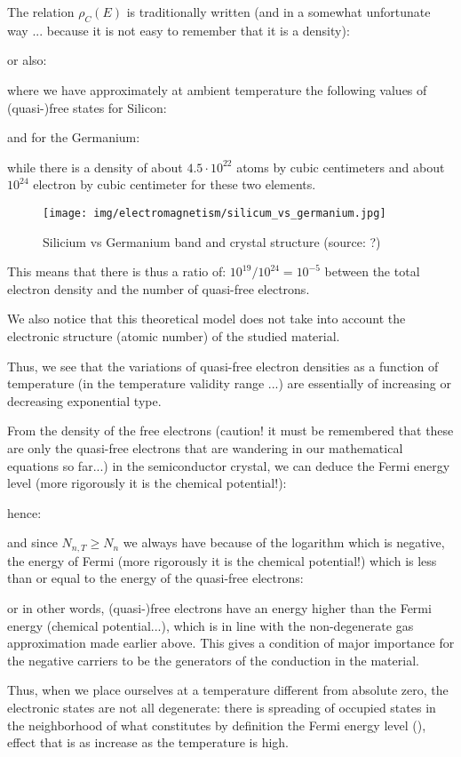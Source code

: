 	The relation $\rho_C(E)$ is traditionally written (and in a somewhat unfortunate way ... because it is not easy to remember that it is a density):
	
	or also:
	
	where we have approximately at ambient temperature the following values of (quasi-)free states for Silicon:
	
	and for the Germanium:
	
	while there is a density of about $4.5\cdot 10^{22}$ atoms by cubic centimeters and about $10^{24}$ electron by cubic centimeter for these two elements.
	\begin{figure}[H]
		\centering
		\texttt{[image: img/electromagnetism/silicum\_vs\_germanium.jpg]}
		\caption[Silicium vs Germanium band and crystal structure]{Silicium vs Germanium band and crystal structure (source: ?)}
	\end{figure}
	This means that there is thus a ratio of: $10^{19}/10^{24}=10^{-5}$ between the total electron density and the number of quasi-free electrons.

	We also notice that this theoretical model does not take into account the electronic structure (atomic number) of the studied material.

	Thus, we see that the variations of quasi-free electron densities as a function of temperature (in the temperature validity range ...) are essentially of increasing or decreasing exponential type.

	From the density of the free electrons (caution! it must be remembered that these are only the quasi-free electrons that are wandering in our mathematical equations so far...) in the semiconductor crystal, we can deduce the Fermi energy level (more rigorously it is the chemical potential!):
	
	hence:
	
	and since $N_{n,T}\ge N_n$ we always have because of the logarithm which is negative, the energy of Fermi (more rigorously it is the chemical potential!) which is less than or equal to the energy of the quasi-free electrons:
	
	or in other words, (quasi-)free electrons have an energy higher than the Fermi energy (chemical potential...), which is in line with the non-degenerate gas approximation made earlier above. This gives a condition of major importance for the negative carriers to be the generators of the conduction in the material.

	Thus, when we place ourselves at a temperature different from absolute zero, the electronic states are not all degenerate: there is spreading of occupied states in the neighborhood of what constitutes by definition the Fermi energy level (), effect that is as increase as the temperature is high.
	
